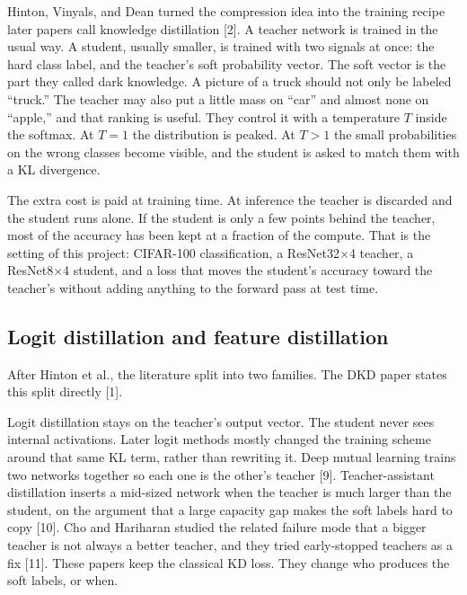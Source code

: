 \documentclass[11pt]{article}
\begin{document}
Hinton, Vinyals, and Dean turned the compression idea into the training recipe later papers call knowledge distillation [2]. A teacher network is trained in the usual way. A student, usually smaller, is trained with two signals at once: the hard class label, and the teacher's soft probability vector. The soft vector is the part they called dark knowledge. A picture of a truck should not only be labeled ``truck.'' The teacher may also put a little mass on ``car'' and almost none on ``apple,'' and that ranking is useful. They control it with a temperature \(T\) inside the softmax. At \(T = 1\) the distribution is peaked. At \(T > 1\) the small probabilities on the wrong classes become visible, and the student is asked to match them with a KL divergence.

The extra cost is paid at training time. At inference the teacher is discarded and the student runs alone. If the student is only a few points behind the teacher, most of the accuracy has been kept at a fraction of the compute. That is the setting of this project: CIFAR-100 classification, a ResNet32\(\times\)4 teacher, a ResNet8\(\times\)4 student, and a loss that moves the student's accuracy toward the teacher's without adding anything to the forward pass at test time.

\subsection{Logit distillation and feature distillation}

After Hinton et al., the literature split into two families. The DKD paper states this split directly [1].

Logit distillation stays on the teacher's output vector. The student never sees internal activations. Later logit methods mostly changed the training scheme around that same KL term, rather than rewriting it. Deep mutual learning trains two networks together so each one is the other's teacher [9]. Teacher-assistant distillation inserts a mid-sized network when the teacher is much larger than the student, on the argument that a large capacity gap makes the soft labels hard to copy [10]. Cho and Hariharan studied the related failure mode that a bigger teacher is not always a better teacher, and they tried early-stopped teachers as a fix [11]. These papers keep the classical KD loss. They change who produces the soft labels, or when.
\end{document}
